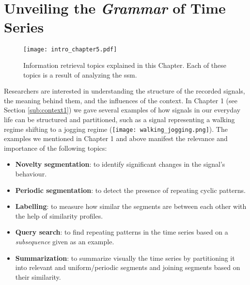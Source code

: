 
%

\chapter{Unveiling the \textit{Grammar} of Time Series}
\label{cha:segmentation}

\begin{figure}[h]
\centering
\texttt{[image: intro\_chapter5.pdf]}
\caption{Information retrieval topics explained in this Chapter. Each of these topics is a result of analyzing the \gls{ssm}.}
\label{fig:info_retrieval_topics}
\end{figure}

Researchers are interested in understanding the structure of the recorded signals, the meaning behind them, and the influences of the context. In Chapter 1 (see Section \ref{sub:context1}) we gave several examples of how signals in our everyday life can be structured and partitioned, such as a signal representing a \textcolor{myblue}{walking} regime shifting to a \textcolor{mygreen}{jogging} regime (\texttt{[image: walking\_jogging.png]}). The examples we mentioned in Chapter 1 and above manifest the relevance and importance of the following topics:

\begin{itemize}
     \item \textbf{Novelty segmentation}: to identify significant changes in the signal's behaviour.
    \item \textbf{Periodic segmentation}: to detect the presence of repeating cyclic patterns.
    \item \textbf{Labelling}: to measure how similar the segments are between each other with the help of similarity profiles.
    \item \textbf{Query search}: to find repeating patterns in the time series based on a \textit{subsequence} given as an example.
    \item \textbf{Summarization}: to summarize visually the time series by partitioning it into relevant and uniform/periodic segments and joining segments based on their similarity.
\end{itemize}

